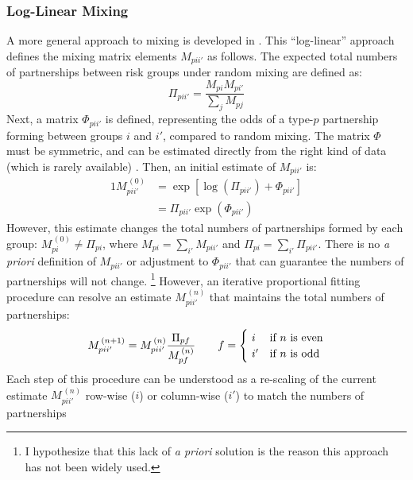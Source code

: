 \subsubsection{Log-Linear Mixing}\label{model.par.mix.ll}
A more general  approach to mixing is developed in \cite{Morris1991}.
This ``log-linear'' approach defines the mixing matrix elements $M_{pii'}$ as follows.
The expected total numbers of partnerships between risk groups under random mixing are defined as:
\begin{equation}\label{eq:mix.rand}
  \Pi_{pii'} = \frac{M_{pi} M_{pi'}}{\sum_{j} M_{pj}}
\end{equation}
Next, a matrix $\Phi_{pii'}$ is defined, representing the odds of
a type-$p$ partnership forming between groups $i$ and $i'$, compared to random mixing.
The matrix $\Phi$ must be symmetric,
and can be estimated directly from the right kind of data
(which is rarely available) \cite{Morris1991}.
Then, an initial estimate of $M_{pii'}$ is:
\begin{alignat}{1}
  M_{pii'}^{\,(0)} &= \exp{\left[\log{\left(\Pi_{pii'}\right)} + \Phi_{pii'} \right]} \nonumber\\
                 &= \Pi_{pii'} \exp{\left(\Phi_{pii'}\right)} \label{eq:mix.M0}
\end{alignat}
However, this estimate changes the total numbers of partnerships formed by each group:
$M_{pi}^{\,(0)} \ne \Pi_{pi}$, where
$M_{pi} = \sum_{i'} M_{pii'}$ and $\Pi_{pi} = \sum_{i'} \Pi_{pii'}$.
There is no \textit{a priori} definition of $M_{pii'}$ or adjustment to $\Phi_{pii'}$
that can guarantee the numbers of partnerships will not change.%
\footnote{I hypothesize that this lack of \textit{a priori} solution
  is the reason this approach has not been widely used.}
However, an iterative proportional fitting procedure \cite{Ruschendorf1995}
can resolve an estimate $M_{pii'}^{\,(n)}$ that maintains the total numbers of partnerships:
\begin{equation}\label{eq:mix.iter}
  M_{pii'}^{\,(n+1)} = M_{pii'}^{\,(n)} \frac{\Pi_{pf}}{M_{pf}^{\,(n)}}
  \qquad f = \begin{cases}
    ~i  & \textnormal{if $n$ is even} \\
    ~i' & \textnormal{if $n$ is odd}
  \end{cases}
\end{equation}
Each step of this procedure can be understood as
a re-scaling of the current estimate $M_{pii'}^{\,(n)}$
row-wise ($i$) or column-wise ($i'$) to match the numbers of partnerships

